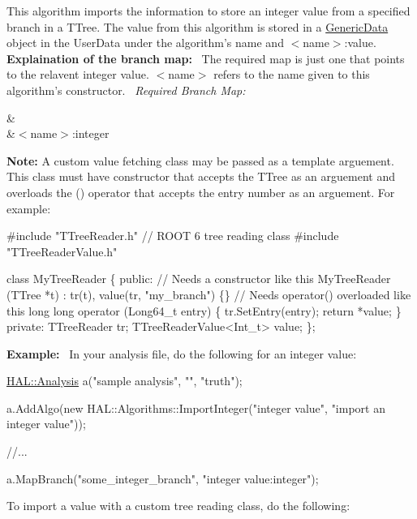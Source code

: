 This algorithm imports the information to store an integer value from a specified branch in a T\+Tree. The value from this algorithm is stored in a \hyperlink{class_h_a_l_1_1_generic_data}{Generic\+Data} object in the User\+Data under the algorithm's name and $<$name$>$\+:value.~\newline
~\newline
{\bfseries Explaination of the branch map\+:}~\newline
The required map is just one that points to the relavent integer value. $<$name$>$ refers to the name given to this algorithm's constructor.~\newline
{\itshape Required Branch Map\+:} \begin{TabularC}{2}
\hline
{}&\PBS{}\\
&\PBS\centering $<$name$>$\+:integer \\
\end{TabularC}
{\bfseries Note\+:} A custom value fetching class may be passed as a template arguement. This class must have constructor that accepts the T\+Tree as an arguement and overloads the () operator that accepts the entry number as an arguement. For example\+: 
\begin{DoxyCode}
\textcolor{preprocessor}{#include "TTreeReader.h"} \textcolor{comment}{// ROOT 6 tree reading class}
\textcolor{preprocessor}{#include "TTreeReaderValue.h"}

\textcolor{keyword}{class }MyTreeReader \{
\textcolor{keyword}{public}:
 \textcolor{comment}{// Needs a constructor like this}
 MyTreeReader (TTree *t) : tr(t), value(tr, \textcolor{stringliteral}{"my\_branch"}) \{\}
 \textcolor{comment}{// Needs operator() overloaded like this}
 \textcolor{keywordtype}{long} \textcolor{keywordtype}{long} operator (Long64\_t entry) \{
   tr.SetEntry(entry);
   \textcolor{keywordflow}{return} *value;
 \}
\textcolor{keyword}{private}:
 TTreeReader tr;
 TTreeReaderValue<Int\_t> value;
\};
\end{DoxyCode}
 {\bfseries Example\+:}~\newline
In your analysis file, do the following for an integer value\+:


\begin{DoxyCode}
\hyperlink{class_h_a_l_1_1_analysis}{HAL::Analysis} a(\textcolor{stringliteral}{"sample analysis"}, \textcolor{stringliteral}{""}, \textcolor{stringliteral}{"truth"});

a.AddAlgo(\textcolor{keyword}{new} HAL::Algorithms::ImportInteger(\textcolor{stringliteral}{"integer value"}, \textcolor{stringliteral}{"import an integer value"}));

\textcolor{comment}{//...}

a.MapBranch(\textcolor{stringliteral}{"some\_integer\_branch"}, \textcolor{stringliteral}{"integer value:integer"});
\end{DoxyCode}
 To import a value with a custom tree reading class, do the following\+:


